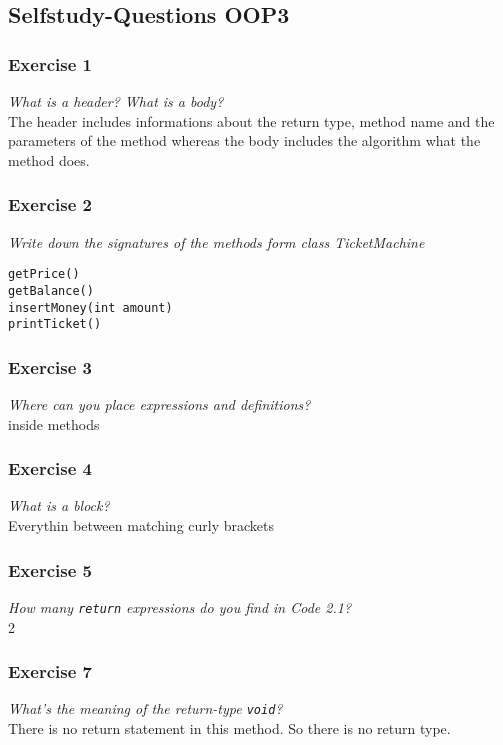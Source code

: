 \subsection{Selfstudy-Questions OOP3}

\subsubsection*{Exercise 1}
\textit{What is a header? What is a body?}\\
The header includes informations about the return type, method name and the 
parameters of the method whereas the body includes the algorithm what the 
method does. 

\subsubsection*{Exercise 2}
\textit{Write down the signatures of the methods form class 
	TicketMachine}\\
\begin{lstlisting}[caption=Signature of the methods from class TicketMachine]
getPrice()
getBalance()
insertMoney(int amount)
printTicket()
\end{lstlisting}

\subsubsection*{Exercise 3}
\textit{Where can you place expressions and definitions?}\\
inside methods

\subsubsection*{Exercise 4}
\textit{What is a block?}\\
Everythin between matching curly brackets

\subsubsection*{Exercise 5}
\textit{How many \lstinline{return} expressions do you find in Code 2.1?}\\
2

\subsubsection*{Exercise 7}
\textit{What's the meaning of the return-type \lstinline{void}?}\\
There is no return statement in this method. So there is no return type. 

